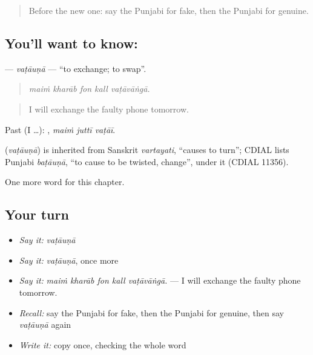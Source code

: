 \begin{quote}
Before the new one: say the Punjabi for fake, then the Punjabi for genuine.
\end{quote}

\subsection*{You'll want to know: }
\textbf{} — \emph{vaṭāuṇā} — \textquotedblleft{}to exchange; to swap\textquotedblright{}.

\begin{quote}
    
\end{quote}

\begin{quote}
\emph{maiṁ kharāb fon kall vaṭāvāṅgā.}
\end{quote}

\begin{quote}
I will exchange the faulty phone tomorrow.
\end{quote}

Past (I …):   , \emph{maiṁ juttī vaṭāī}.

\begin{cousinweb}
\textbf{} (\emph{vaṭāuṇā}) is inherited from Sanskrit \emph{vartayati}, \textquotedblleft{}causes to turn\textquotedblright{}; CDIAL lists Punjabi \emph{baṭāuṇā}, \textquotedblleft{}to cause to be twisted, change\textquotedblright{}, under it (CDIAL 11356).
\end{cousinweb}

\begin{grammarlens}[title={What you've built}]
One more word for this chapter.
\end{grammarlens}

\subsection*{Your turn}
\begin{itemize}
\raggedright
  \item \emph{Say it:} \emph{vaṭāuṇā}
  \item \emph{Say it:} \emph{vaṭāuṇā}, once more
  \item \emph{Say it:} \emph{maiṁ kharāb fon kall vaṭāvāṅgā.} — I will exchange the faulty phone tomorrow.
  \item \emph{Recall:} say the Punjabi for fake, then the Punjabi for genuine, then say \emph{vaṭāuṇā} again
  \item \emph{Write it:} copy \textbf{} once, checking the whole word
\end{itemize}

